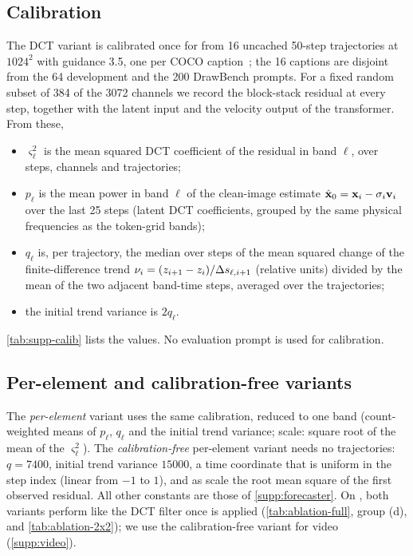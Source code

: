\subsection{Calibration}
\label{supp:calib}
The DCT variant is calibrated once for \flux from 16 uncached 50-step trajectories at $1024^2$ with guidance 3.5, one
per COCO caption~\cite{lin2014coco}; the 16 captions are disjoint from the 64 development and the 200 DrawBench prompts.
For a fixed random subset of 384 of the 3072 channels we record the block-stack residual at every step, together with
the latent input and the velocity output of the transformer. From these,
\begin{itemize}[leftmargin=*,itemsep=1pt,topsep=2pt]
  \item $\varsigma^2_\ell$ is the mean squared DCT coefficient of the residual in band $\ell$, over steps, channels and
  trajectories;
  \item $p_\ell$ is the mean power in band $\ell$ of the clean-image estimate $\hat{\mathbf{x}}_0=\mathbf{x}_i-\sigma_i\mathbf{v}_i$ over
  the last 25 steps (latent DCT coefficients, grouped by the same physical frequencies as the token-grid bands);
  \item $q_\ell$ is, per trajectory, the median over steps of the mean squared change of the finite-difference trend
  $\nu_i=(z_{i+1}-z_i)/\Delta s_{\ell,i+1}$ (relative units) divided by the mean of the two adjacent band-time steps,
  averaged over the trajectories;
  \item the initial trend variance is $2q_\ell$.
\end{itemize}
\cref{tab:supp-calib} lists the values. No evaluation prompt is used for calibration.

\subsection{Per-element and calibration-free variants}
\label{supp:variants}
The \emph{per-element} variant uses the same calibration, reduced to one band (count-weighted means of $p_\ell$, $q_\ell$
and the initial trend variance; scale: square root of the mean of the $\varsigma^2_\ell$). The \emph{calibration-free} per-element variant needs no
trajectories: $q=7400$, initial trend variance $15000$, a time coordinate that is uniform in the step index (linear
from $-1$ to $1$), and as scale the root mean square of the first observed residual. All other constants are those of
\cref{supp:forecaster}. On \flux, both variants perform like the DCT filter once \pcgs is applied
(\cref{tab:ablation-full}, group (d), and \cref{tab:ablation-2x2}); we use the calibration-free variant for video
(\cref{supp:video}).

